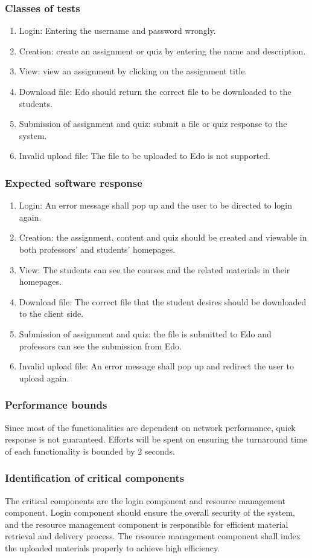 \documentclass[paper=a4, fontsize=11pt]{scrartcl}
\numberwithin{equation}{section}		%
\numberwithin{figure}{section}			%
\numberwithin{table}{section}				%
\begin{document}
\subsubsection{Classes of tests}
\begin{enumerate}
	\item Login: Entering the username and password wrongly.
	\item Creation: create an assignment or quiz by entering the name and description.
	\item View: view an assignment by clicking on the assignment title.
	\item Download file: Edo should return the correct file to be downloaded to the students.
	\item Submission of assignment and quiz: submit a file or quiz response to the system.
	\item Invalid upload file: The file to be uploaded to Edo is not supported.
\end{enumerate}
\subsubsection{Expected software response}
\begin{enumerate}
	\item Login: An error message shall pop up and the user to be directed to login again.
	\item Creation: the assignment, content and quiz should be created and viewable in both professors' and students' homepages.
	\item View: The students can see the courses and the related materials in their homepages.
	\item Download file: The correct file that the student desires should be downloaded to the client side.
	\item Submission of assignment and quiz: the file is submitted to Edo and professors can see the submission from Edo.
	\item Invalid upload file: An error message shall pop up and redirect the user to upload again.
\end{enumerate}

\subsubsection{Performance bounds}
Since most of the functionalities are dependent on network performance, quick response is not guaranteed. Efforts will be spent on ensuring the turnaround time of each functionality is bounded by 2 seconds. 

\subsubsection{Identification of critical components}
The critical components are the login component and resource management component. Login component should ensure the overall security of the system, and the resource management component is responsible for efficient material retrieval and delivery process. The resource management component shall index the uploaded materials properly to achieve high efficiency.
\end{document}
